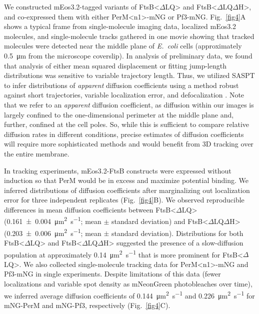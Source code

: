 \documentclass[twocolumn,pdflatex,sn-nature]{sn-jnl}%
\def\textsuperscript#1{<#1>}%
\newcommand\ec{\textit{E.~coli}}
\newcommand\ftsbdLQ{FtsB\textsuperscript{$\Delta{}$LQ}}
\newcommand\ftsbdLQdH{FtsB\textsuperscript{$\Delta{}$LQ$\Delta{}$H}}
\newcommand\permN{PerM\textsuperscript{n1}}
\begin{document}
We constructed mEos3.2-tagged variants of \ftsbdLQ{} and \ftsbdLQdH{}, and co-expressed them with either \permN{}-mNG or Pf3-mNG.
Fig.~\ref{fig4}A shows a typical frame from single-molecule imaging data, localized mEos3.2 molecules, and single-molecule tracks gathered in one movie showing that tracked molecules were detected near the middle plane of \ec{} cells (approximately \qty{0.5}{\um} from the microscope coverslip).
In analysis of preliminary data, we found that analysis of either mean squared displacement or fitting jump-length distributions was sensitive to variable trajectory length.
Thus, we utilized SASPT \citep{heckertRecoveringMixturesFastdiffusing2022a} to infer distributions of \textit{apparent} diffusion coefficients using a method robust against short trajectories, variable localization error, and defocalization \cite{hansenRobustModelbasedAnalysis2018a}.
Note that we refer to an \textit{apparent} diffusion coefficient, as diffusion within our images is largely confined to the one-dimensional perimeter at the middle plane and, further, confined at the cell poles.
So, while this is sufficient to compare relative diffusion rates in different conditions, precise estimates of diffusion coefficients will require more sophisticated methods and would benefit from 3D tracking over the entire membrane.

In tracking experiments, mEos3.2-FtsB constructs were expressed without induction so that PerM would be in excess and maximize potential binding.
We inferred distributions of diffusion coefficients after marginalizing out localization error for three independent replicates (Fig.~\ref{fig4}B).
We observed reproducible differences in mean diffusion coefficients between \ftsbdLQ{} (\qty{0.161 +- 0.004}{\square\um\per\s}; mean $\pm$ standard deviation) and \ftsbdLQdH{} (\qty{0.203 +- 0.006}{\square\um\per\s}; mean $\pm$ standard deviation).
Distributions for both \ftsbdLQ{} and \ftsbdLQdH{} suggested the presence of a slow-diffusion population at approximately \qty{0.14}{\square\um\per\s} that is more prominent for \ftsbdLQ{}.
We also collected single-molecule tracking data for \permN{}-mNG and Pf3-mNG in single experiments.
Despite limitations of this data (fewer localizations and variable spot density as mNeonGreen photobleaches over time), we inferred average diffusion coefficients of \qty{0.144}{\square\um\per\s} and \qty{0.226}{\square\um\per\s} for mNG-PerM and mNG-Pf3, respectively (Fig.~\ref{fig4}C).
\end{document}
